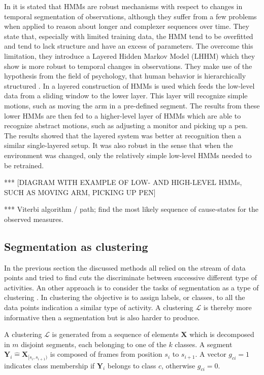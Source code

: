 In \cite{oliver2002layered} it is stated that HMMs are robust mechanisms with
respect to changes in temporal segmentation of observations, although they
suffer from a few problems when applied to reason about longer and complexer
sequences over time. They state that, especially with limited training data,
the HMM tend to be overfitted and tend to lack structure and have an excess of
parameters. The overcome this limitation, they introduce a Layered Hidden
Markov Model (LHHM) which they show is more robust to temporal changes in
observations. They make use of the hypothesis from the field of psychology,
that human behavior is hierarchically structured \cite{zacks2001event}. In
\cite{perdikis2008recognition} a layered construction of HMMs is used which
feeds the low-level data from a sliding window to the lower layer. This layer
will recognize simple motions, such as moving the arm in a pre-defined
segment. The results from these lower HMMs are then fed to a higher-level
layer of HMMs which are able to recognize abstract motions, such as adjusting
a monitor and picking up a pen. The results showed that the layered system was
better at recognition then a similar single-layered setup. It was also robust
in the sense that when the environment was changed, only the relatively simple
low-level HMMs needed to be retrained.

*** [DIAGRAM WITH EXAMPLE OF LOW- AND HIGH-LEVEL HMMs, SUCH AS MOVING ARM,
PICKING UP PEN]


*** Viterbi algorithm / path; find the most likely sequence of cause-states
for
the observed measures.





\subsection{Segmentation as clustering}
In the previous section the discussed methods all relied on the stream of data
points and tried to find cuts the discriminate between successive different
type of activities. An other approach is to consider the tasks of segmentation
as a type of clustering \cite{zhou2008aligned}. In clustering the objective is
to assign labels, or classes, to all the data points indication a similar type
of activity. A clustering $\mathcal{L}$ is thereby more informative then a
segmentation but is also harder to produce.

A clustering $\mathcal{L}$ is generated from a sequence of elements
$\mathbf{X}$ which is decomposed in $m$ disjoint segments, each belonging to
one of the $k$ classes. A segment $\mathbf{Y}_i \hat{=}
\mathbf{X}_{[s_i,s_{i+1})}$ is composed of frames from position $s_i$ to
$s_{i+1}$. A vector $g_{ci} = 1$ indicates class membership if $\mathbf{Y}_i$
belongs to class $c$, otherwise $g_{ci} = 0$.

